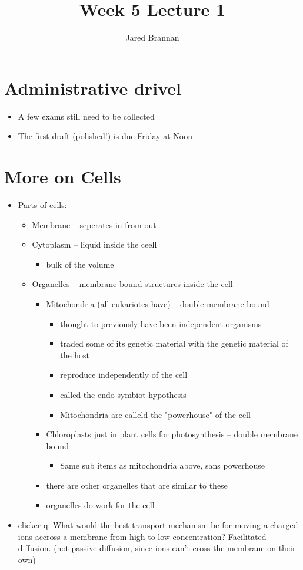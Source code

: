 \documentclass{article}
\title{Week 5 Lecture 1}
\author{Jared Brannan }
\theoremstyle{definition}
\begin{document}
\maketitle

\section{Administrative drivel}
\begin{itemize}
	\item A few exams still need to be collected
	\item The first draft (polished!) is due Friday at Noon
\end{itemize}

\section{More on Cells}
\begin{itemize}
	\item Parts of cells:
		\begin{itemize}
			\item Membrane -- seperates in from out
			\item Cytoplasm -- liquid inside the ceell
				\begin{itemize}
					\item bulk of the volume
				\end{itemize}
			\item Organelles -- membrane-bound structures inside the cell
				\begin{itemize}
					\item Mitochondria (all eukariotes have) -- double membrane bound
						\begin{itemize}
							\item thought to previously have been independent organisms
							\item traded some of its genetic material with the genetic material of the host
							\item reproduce independently of the cell
							\item called the endo-symbiot hypothesis
							\item Mitochondria are calleld the "powerhouse" of the cell
						\end{itemize}
					\item Chloroplasts just in plant cells for photosynthesis -- double membrane bound
						\begin{itemize}
							\item Same sub items as mitochondria above, sans powerhouse
						\end{itemize}
					\item there are other organelles that are similar to these
					\item organelles do work for the cell
				\end{itemize}
		\end{itemize}
	\item clicker q: What would the best transport mechanism be for moving a charged ions accross a membrane from high to low concentration? Facilitated diffusion. (not passive diffusion, since ions can't cross the membrane on their own)
\end{itemize}
\end{document}
